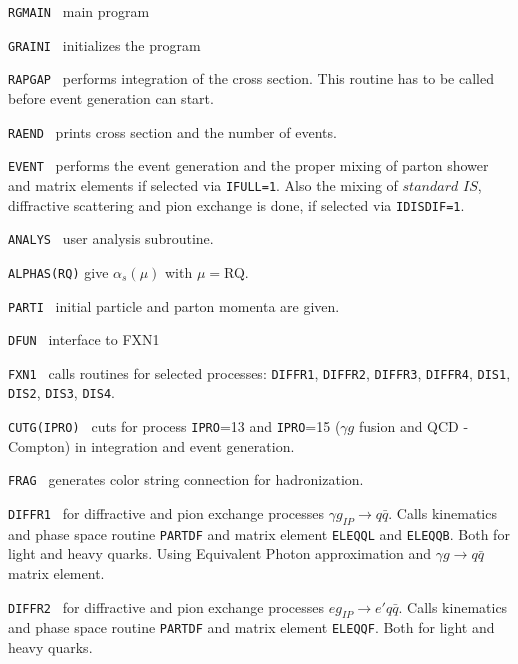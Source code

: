 \documentclass[10pt]{article} \usepackage{dina4}
\newcommand{\PO}{\ensuremath{ I\! \! P} }
\newcommand{\deflab}[1]{#1\hfil}%
\newenvironment{defl}[1]%
  {\begin{list}{}{\settowidth{\labelwidth}{#1}%
  \setlength{\leftmargin}{\labelwidth}%
  \addtolength{\leftmargin}{\labelsep}%
  \setlength{\itemsep}{0pt plus 1pt}
  \setlength{\parsep}{0pt plus 1pt}
  \setlength{\topsep}{0pt plus 1pt}
  \setlength{\partopsep}{0pt plus 1pt}
  \setlength{\parskip}{2mm plus 1mm minus 1mm}
  \let\makelabel\deflab}}%
  {\end{list}}
\begin{document}
\begin{defl}{123456789012345}
\item[{\tt RGMAIN }]
                  main program
\item[{\tt GRAINI }]
                   initializes the program
\item[{\tt RAPGAP }]
    performs integration of the cross section. This routine has to be
            called before event generation can start.
\item[{\tt RAEND }]
            prints cross section and the number of events.
\item[{\tt EVENT }]
         performs the event generation and the proper mixing of 
         parton shower and matrix elements if selected via 
         {\tt IFULL=1}.
         Also the mixing of $standard$ $IS$, diffractive scattering
         and pion exchange is done, if selected via \verb+IDISDIF=1+.
\item[{\tt ANALYS }]
         user analysis subroutine.
\item[{\tt ALPHAS(RQ)}]
          give $\alpha_s (\mu)$ with $\mu = $RQ.
\item[{\tt PARTI }]
          initial particle and parton momenta are given.
\item[{\tt DFUN }]
          interface to FXN1
\item[{\tt FXN1 }]
          calls routines for selected processes:
          \verb+DIFFR1+, \verb+DIFFR2+, \verb+DIFFR3+, 
          \verb+DIFFR4+, \verb+DIS1+, \verb+DIS2+, \verb+DIS3+,
          \verb+DIS4+.
\item[{\tt CUTG(IPRO) }]
          cuts for process \verb+IPRO+=13 and \verb+IPRO+=15
          ($\gamma g$ fusion and QCD - Compton)  
          in integration and
          event generation.
\item[{\tt FRAG }]
          generates color string connection for hadronization.
\item[{\tt DIFFR1 }] for diffractive and pion exchange processes
  $ \gamma g_{\PO} \rightarrow q \bar{q}$.
          Calls kinematics and phase space routine \verb+PARTDF+
          and matrix element \verb+ELEQQL+ and \verb+ELEQQB+.
          Both for light and heavy quarks.
          Using Equivalent Photon approximation and $\gamma g \to
          q \bar{q}$ matrix element.
\item[{\tt DIFFR2 }] for diffractive and pion exchange processes
  $ e g_{\PO} \rightarrow e' q \bar{q}$.
          Calls kinematics and phase space routine \verb+PARTDF+
          and matrix element \verb+ELEQQF+. Both for light and heavy quarks.

\end{defl}
\end{document}
